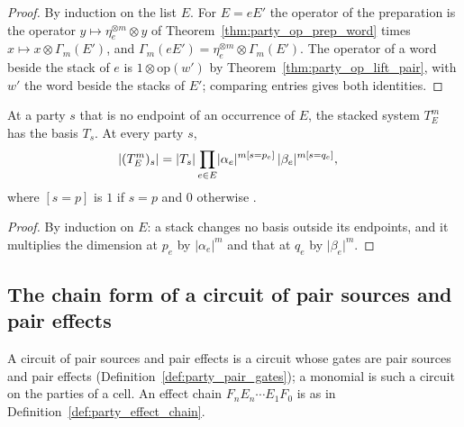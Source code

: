 \begin{proof}\leanok
    By induction on the list $E$. For $E=eE'$ the operator of the preparation is
    the operator $y\mapsto\eta_e^{\otimes m}\otimes y$ of
    Theorem~\ref{thm:party_op_prep_word} times $x\mapsto x\otimes\Gamma_m(E')$,
    and $\Gamma_m(eE')=\eta_e^{\otimes m}\otimes\Gamma_m(E')$. The operator of a
    word beside the stack of $e$ is $1\otimes\mathrm{op}(w')$ by
    Theorem~\ref{thm:party_op_lift_pair}, with $w'$ the word beside the stacks of
    $E'$; comparing entries gives both identities.
\end{proof}

\begin{theorem}
    \label{thm:party_stack_ownership}
    \leanok
    At a party $s$ that is no endpoint of an occurrence of $E$, the stacked system
    $T^m_E$ has the basis $T_s$. At every party $s$,
    \begin{align}
        \lvert(T^m_E)_s\rvert
         & =\lvert T_s\rvert\prod_{e\in E}
        \lvert\alpha_e\rvert^{m[s=p_e]}\,\lvert\beta_e\rvert^{m[s=q_e]},
        \notag
    \end{align}
    where $[s=p]$ is $1$ if $s=p$ and $0$ otherwise
    \cite[Lemma~5.1]{OpenAI2026PolynomialPEPS}.
\end{theorem}

\begin{proof}\leanok
    By induction on $E$: a stack changes no basis outside its endpoints, and it
    multiplies the dimension at $p_e$ by $\lvert\alpha_e\rvert^m$ and that at $q_e$
    by $\lvert\beta_e\rvert^m$.
\end{proof}

\subsection{The chain form of a circuit of pair sources and pair effects}
\label{sec:party_chain_form}

A circuit of pair sources and pair effects is a circuit whose gates are pair
sources and pair effects (Definition~\ref{def:party_pair_gates}); a monomial is
such a circuit on the parties of a cell. An effect chain
$F_nE_n\cdots E_1F_0$ is as in Definition~\ref{def:party_effect_chain}.

